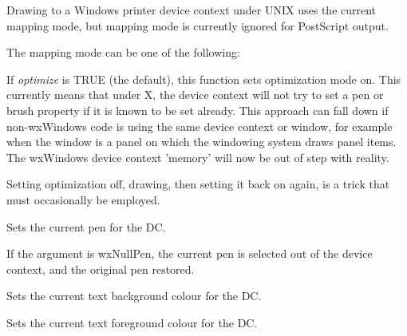 Drawing to a Windows printer device context under UNIX
uses the current mapping mode, but mapping mode is currently ignored for
PostScript output.

The mapping mode can be one of the following:

\begin{twocollist}\itemsep=0pt
\end{twocollist}

\label{wxsetoptimization}


If {\it optimize} is TRUE (the default), this function sets optimization mode on.
This currently means that under X, the device context will not try to set a pen or brush
property if it is known to be set already. This approach can fall down
if non-wxWindows code is using the same device context or window, for example
when the window is a panel on which the windowing system draws panel items.
The wxWindows device context 'memory' will now be out of step with reality.

Setting optimization off, drawing, then setting it back on again, is a trick
that must occasionally be employed.

\label{wxdcsetpen}


Sets the current pen for the DC.

If the argument is wxNullPen, the current pen is selected out of the device
context, and the original pen restored.

\label{wxdcsettextbackground}


Sets the current text background colour for the DC.

\label{wxdcsettextforeground}


Sets the current text foreground colour for the DC.

